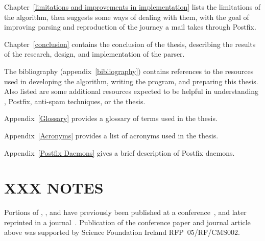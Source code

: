 Chapter~\ref{limitations and improvements in implementation} lists the
limitations of the algorithm, then suggests some ways of dealing with them,
with the goal of improving parsing and reproduction of the journey a mail
takes through Postfix.

Chapter~\ref{conclusion} contains the conclusion of the thesis, describing
the results of the research, design, and implementation of the parser.

The bibliography (appendix~\ref{bibliography}) contains references to the
resources used in developing the algorithm, writing the program, and
preparing this thesis.  Also listed are some additional resources expected
to be helpful in understanding , Postfix, anti-spam
techniques, or the thesis.

Appendix~\ref{Glossary} provides a glossary of terms used in the thesis.

Appendix~\ref{Acronyms} provides a list of acronyms used in the thesis.

Appendix~\ref{Postfix Daemons} gives a brief description of Postfix
daemons.

\section{XXX NOTES}

Portions of , , and  have previously been published at
a conference~\cite{sgai-2008}, and later reprinted in a
journal~\cite{elsevier-2009}.  Publication of the conference paper and
journal article above was supported by Science Foundation Ireland
RFP~05/RF/CMS002.
